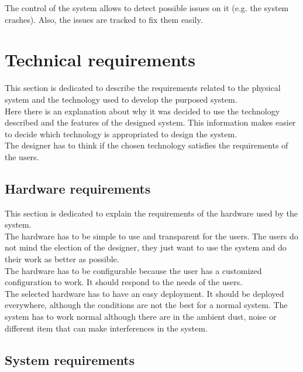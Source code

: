 The control of the system allows to detect possible issues on it (e.g. the system crashes). Also, the issues are tracked to fix them easily.

\section{Technical requirements}

This section is dedicated to describe the requirements related to the physical system and the technology used to develop the purposed system.\\

Here there is an explanation about why it was decided to use the technology described and the features of the designed system. This information makes easier to decide which technology is appropriated to design the system.\\

The designer has to think if the chosen technology satisfies the requirements of the users.


\subsection{Hardware requirements}

This section is dedicated to explain the requirements of the hardware used by the system.\\

The hardware has to be simple to use and transparent for the users. The users do not mind the election of the designer, they just want to use the system and do their work as better as possible.\\

The hardware has to be configurable because the user has a customized configuration to work. It should respond to the needs of the users.\\

The selected hardware has to have an easy deployment. It should be deployed everywhere, although the conditions are not the best for a normal system. The system has to work normal although there are in the ambient dust, noise or different item that can make interferences in the system.

\subsection{System requirements}

